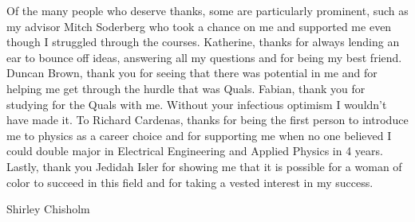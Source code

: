 \begin{acknowledgements}
  Of the many people who deserve thanks, some are particularly prominent,
  such as my advisor Mitch Soderberg who took a chance on me and supported me even though I struggled through the courses. Katherine, thanks for always lending an ear to bounce off ideas, answering all my questions and for being my best friend. Duncan Brown, thank you for seeing that there was potential in me and for helping me get through the hurdle that was Quals. Fabian, thank you for studying for the Quals with me. Without your infectious optimism I wouldn't have made it. To Richard Cardenas, thanks for being the first person to introduce me to physics as a career choice and for supporting me when no one believed I could double major in Electrical Engineering and Applied Physics in 4 years. Lastly, thank you Jedidah Isler for showing me that it is possible for a woman of color to succeed in this field and for taking a vested interest in my success.     
\end{acknowledgements}




{\tableofcontents \listoffigures \listoftables}

%
  {Shirley Chisholm}
\thispagestyle{empty}
